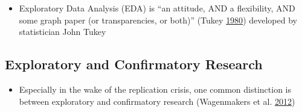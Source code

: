 \documentclass[
]{article}
\providecommand{\tightlist}{%
  \setlength{\itemsep}{0pt}\setlength{\parskip}{0pt}}
\begin{document}
\begin{itemize}
\tightlist
\item
  Exploratory Data Analysis (EDA) is ``an attitude, AND a flexibility, AND some graph paper (or transparencies, or both)'' (Tukey \protect\hyperlink{ref-TukeyWeNeedBoth1980}{1980}) developed by statistician John Tukey
\end{itemize}

\hypertarget{exploratory-and-confirmatory-research}{%
\subsection{Exploratory and Confirmatory Research}\label{exploratory-and-confirmatory-research}}

\begin{itemize}
\tightlist
\item
  Especially in the wake of the replication crisis, one common distinction is between exploratory and confirmatory research (Wagenmakers et al. \protect\hyperlink{ref-WagenmakersAgendaPurelyConfirmatory2012}{2012})
\end{itemize}
\end{document}
